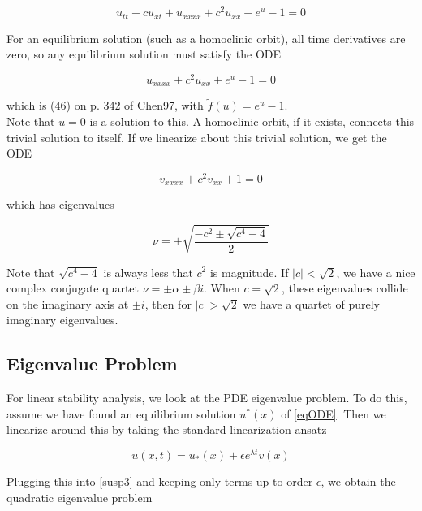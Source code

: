 \documentclass[12pt]{article}
\begin{document}
\begin{equation}\label{susp3}
u_{tt} - c u_{x t} + u_{xxxx} + c^2 u_{xx} + e^{u} - 1 = 0
\end{equation}

For an equilibrium solution (such as a homoclinic orbit), all time derivatives are zero, so any equilibrium solution must satisfy the ODE

\begin{equation}\label{eqODE}
u_{xxxx} + c^2 u_{xx} + e^{u} - 1 = 0
\end{equation}

which is (46) on p. 342 of Chen97, with $\tilde{f}(u) = e^u - 1$.\\

Note that $u = 0$ is a solution to this. A homoclinic orbit, if it exists, connects this trivial solution to itself. If we linearize about this trivial solution, we get the ODE

\begin{equation}
v_{xxxx} + c^2 v_{xx} + 1 = 0
\end{equation}

which has eigenvalues

\begin{equation}
\nu = \pm \sqrt{\frac{-c^2 \pm \sqrt{c^4 - 4}}{2} }
\end{equation}

Note that $\sqrt{c^4 - 4}$ is always less that $c^2$ is magnitude. If $|c| < \sqrt{2}$, we have a nice complex conjugate quartet $\nu = \pm \alpha \pm \beta i$. When $c = \sqrt{2}$, these eigenvalues collide on the imaginary axis at $\pm i$, then for $|c| > \sqrt{2}$ we have a quartet of purely imaginary eigenvalues. 

\subsection{Eigenvalue Problem}

For linear stability analysis, we look at the PDE eigenvalue problem. To do this, assume we have found an equilibrium solution $u^*(x)$ of \eqref{eqODE}. Then we linearize around this by taking the standard linearization ansatz

\begin{equation}
u(x,t) = u_*(x) + \epsilon e^{\lambda t} v(x)
\end{equation}

Plugging this into \eqref{susp3} and keeping only terms up to order $\epsilon$, we obtain the quadratic eigenvalue problem
\end{document}
